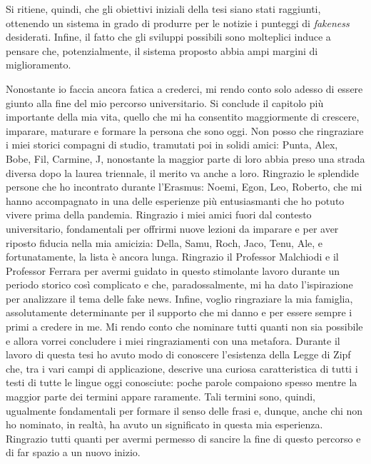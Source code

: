 \documentclass[12pt]{report}
\theoremstyle{definition}
\begin{document}
Si ritiene, quindi, che gli obiettivi iniziali della tesi siano stati raggiunti, ottenendo un sistema in grado di produrre per le notizie i punteggi di \textit{fakeness} desiderati.
Infine, il fatto che gli sviluppi possibili sono molteplici induce a pensare che, potenzialmente, il sistema proposto abbia ampi margini di miglioramento.

\printbibliography

%
Nonostante io faccia ancora fatica a crederci, mi rendo conto solo adesso di essere giunto alla fine del mio percorso universitario. Si conclude il capitolo più importante della mia vita, quello che mi ha consentito maggiormente di crescere, imparare, maturare e formare la persona che sono oggi.
Non posso che ringraziare i miei storici compagni di studio, tramutati poi in solidi amici: Punta, Alex, Bobe, Fil, Carmine, J, nonostante la maggior parte di loro abbia preso una strada diversa dopo la laurea triennale, il merito va anche a loro.
Ringrazio le splendide persone che ho incontrato durante l'Erasmus: Noemi, Egon, Leo, Roberto, che mi hanno accompagnato in una delle esperienze più entusiasmanti che ho potuto vivere prima della pandemia.
Ringrazio i miei amici fuori dal contesto universitario, fondamentali per offrirmi nuove lezioni da imparare e per aver riposto fiducia nella mia amicizia: Della, Samu, Roch, Jaco, Tenu, Ale, e fortunatamente, la lista è ancora lunga.
Ringrazio il Professor Malchiodi e il Professor Ferrara per avermi guidato in questo stimolante lavoro durante un periodo storico così complicato e che, paradossalmente, mi ha dato l'ispirazione per analizzare il tema delle fake news.
Infine, voglio ringraziare la mia famiglia, assolutamente determinante per il supporto che mi danno e per essere sempre i primi a credere in me.
Mi rendo conto che nominare tutti quanti non sia possibile e allora vorrei concludere i miei ringraziamenti con una metafora. Durante il lavoro di questa tesi ho avuto modo di conoscere l'esistenza della Legge di Zipf che, tra i vari campi di applicazione, descrive una curiosa caratteristica di tutti i testi di tutte le lingue oggi conosciute: 
poche parole compaiono spesso mentre la maggior parte dei termini appare raramente. Tali termini sono, quindi, ugualmente fondamentali per formare il senso delle frasi e, dunque, anche chi non ho nominato, in realtà, ha avuto un significato in questa mia esperienza. Ringrazio tutti quanti per avermi permesso di sancire la fine di questo percorso e di far spazio a un nuovo inizio.
\end{document}
